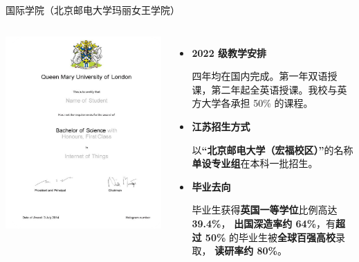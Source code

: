 \documentclass[aspectratio=169, utf8]{beamer}
\begin{document}
\begin{frame}{国际学院（北京邮电大学玛丽女王学院）}
\begin{columns}
        \includegraphics[width=\textwidth]{./resources/17.png}

        \footnotesize
        \begin{itemize}
            \item \textcolor{Fore}{\textbf{2022 级教学安排}}

                  四年均在国内完成。第一年双语授课，第二年起全英语授课。我校与英方大学各承担 50\% 的课程。

            \item \textcolor{Fore}{\textbf{江苏招生方式}}

                  以\textcolor{Fore}{\textbf{“北京邮电大学（宏福校区）”}}的名称\textcolor{Fore}{\textbf{单设专业组}}在本科一批招生。

            \item \textcolor{Fore}{\textbf{毕业去向}}

                  毕业生获得\textcolor{Fore}{\textbf{英国一等学位}}比例高达 \textcolor{Fore}{\textbf{39.4\%}}，
                  \textcolor{Fore}{\textbf{出国深造率约 64\%}}，有\textcolor{Fore}{\textbf{超过 50\%}} 的毕业生被\textcolor{Fore}{\textbf{全球百强高校}}录取，
                  \textcolor{Fore}{\textbf{读研率约 80\%}}。
        \end{itemize}
    \end{columns}
\end{frame}
\end{document}

